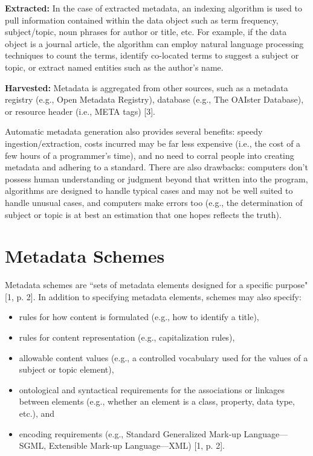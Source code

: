\documentclass[10pt,oneside]{memoir}
\begin{document}
\textbf{Extracted:} In the case of extracted metadata, an indexing algorithm is used to pull information contained within the data object such as term frequency, subject/topic, noun phrases for author or title, etc. For example, if the data object is a journal article, the algorithm can employ natural language processing techniques to count the terms, identify co-located terms to suggest a subject or topic, or extract named entities such as the author's name.

\textbf{Harvested:} Metadata is aggregated from other sources, such as a metadata registry (e.g., Open Metadata Registry), database (e.g., The OAIster Database), or resource header (i.e., META tags) [3].

Automatic metadata generation also provides several benefits: speedy ingestion/extraction, costs incurred may be far less expensive (i.e., the cost of a few hours of a programmer's time), and no need to corral people into creating metadata and adhering to a standard. There are also drawbacks: computers don't possess human understanding or judgment beyond that written into the program, algorithms are designed to handle typical cases and may not be well suited to handle unusual cases, and computers make errors too (e.g., the determination of subject or topic is at best an estimation that one hopes reflects the truth).

\section{Metadata Schemes}

Metadata schemes are ``sets of metadata elements designed for a specific purpose" [1, p. 2]. In addition to specifying metadata elements, schemes may also specify:

\begin{itemize}
 \item rules for how content is formulated (e.g., how to identify a title),
 \item rules for content representation (e.g., capitalization rules),
 \item allowable content values (e.g., a controlled vocabulary used for the values of a subject or topic element),
 \item ontological and syntactical requirements for the associations or linkages between elements (e.g., whether an element is a class, property, data type, etc.), and
 \item encoding requirements (e.g., Standard Generalized Mark-up Language---SGML, Extensible Mark-up Language---XML) [1, p. 2].
 \end{itemize}
\end{document}
